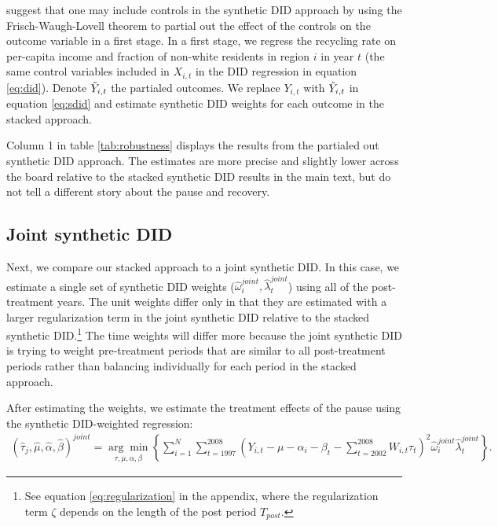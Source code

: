 \documentclass[12pt]{article}
\begin{document}
\cite{arkhangelsky2021} suggest that one may include controls in the synthetic DID approach by using the Frisch-Waugh-Lovell theorem to partial out the effect of the controls on the outcome variable in a first stage.  In a first stage, we regress the recycling rate on per-capita income and fraction of non-white residents in region \(i\) in year \(t\) (the same control variables included in \(X_{i,t}\) in the DID regression in equation \ref{eq:did}).  Denote \(\Tilde{Y}_{i,t}\) the partialed outcomes.  We replace \(Y_{i,t}\) with \(\Tilde{Y}_{i,t}\) in equation \ref{eq:sdid} and estimate synthetic DID weights for each outcome in the stacked approach.

Column 1 in table \ref{tab:robustness} displays the results from the partialed out synthetic DID approach.  The estimates are more precise and slightly lower across the board relative to the stacked synthetic DID results in the main text, but do not tell a different story about the pause and recovery.

\subsection{Joint synthetic DID}

Next, we compare our stacked approach to a joint synthetic DID.  In this case, we estimate a single set of synthetic DID weights (\(\hat{\omega}_i^{joint},\hat{\lambda}_t^{joint}\)) using all of the post-treatment years.  The unit weights differ only in that they are estimated with a larger regularization term in the joint synthetic DID relative to the stacked synthetic DID.\footnote{See equation \ref{eq:regularization} in the appendix, where the regularization term \(\zeta\) depends on the length of the post period \(T_{post}\).}  The time weights will differ more because the joint synthetic DID is trying to weight pre-treatment periods that are similar to all post-treatment periods rather than balancing individually for each period in the stacked approach.  

After estimating the weights, we estimate the treatment effects of the pause using the synthetic DID-weighted regression:
\begin{align} \label{eq:sdidj}
     (\hat{\tau}_j,\hat{\mu},\hat{\alpha},\hat{\beta})^{joint} = \underset{\tau,\mu,\alpha,\beta}{\arg\min} \left\lbrace \sum_{i=1}^{N} \sum_{t=1997}^{2008}  \left( Y_{i,t} - \mu - \alpha_i - \beta_t - \sum_{t=2002}^{2008} W_{i,t} \tau_t \right)^2 \hat{\omega}_i^{joint} \hat{\lambda}_t^{joint} \right\rbrace.
\end{align}
\end{document}
